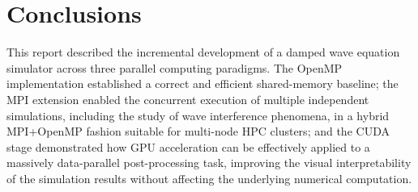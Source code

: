 \documentclass[10pt,twocolumn]{article}
\begin{document}
\section{Conclusions}
This report described the incremental development of a damped wave
equation simulator across
three parallel computing paradigms. The OpenMP implementation
established a correct and
efficient shared-memory baseline; the MPI extension enabled the
concurrent execution of
multiple independent simulations, including the study of wave
interference phenomena, in a
hybrid MPI+OpenMP fashion suitable for multi-node HPC clusters; and
the CUDA stage demonstrated
how GPU acceleration can be effectively applied to a massively
data-parallel post-processing
task, improving the visual interpretability of the simulation results
without affecting the
underlying numerical computation. 

\end{document}
